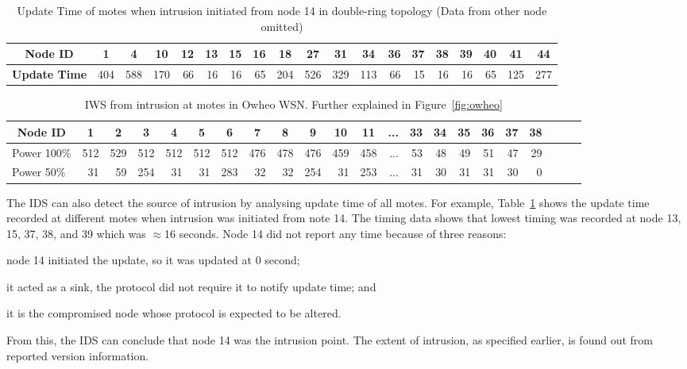 \documentclass[conference]{IEEEtran}
\newcommand*{\bd}[1]{\multicolumn{1}{|c|}{\bfseries #1}}
\begin{document}
\begin{table}[t]
\centering
\begin{tabular}{|l|*{17}{r|}r|}
\hline
\bd{Node ID}           & \bd{1} & \bd{4} & \bd{10} & \bd{12} & \bd{13} & \bd{15} & \bd{16} & \bd{18} & \bd{27} & \bd{31} & \bd{34} & \bd{36} & \bd{37} & \bd{38} & \bd{39} & \bd{40} & \bd{41} & \bd{44}\\
\hline
\bd{Update Time}  &   404 	&  588 	& 170 	& 66 	& 16 &	 16 	& 65 &	 204 &	 526 & 329 &	 113 &	 66 &	 15 	& 16 	& 16 &	 65 &	125 & 277 \\
\hline
\end{tabular}
\caption{Update Time of motes when intrusion initiated from node 14 in double-ring topology (Data from other node omitted) }
\label{tab:dr_time_14}
\end{table}

\begin{table}[t!]
\centering
\begin{tabular}{|l|*{20}{r|}r|}
\hline
\bd{Node ID}           & \bd{1} & \bd{2} & \bd{3} & \bd{4} & \bd{5} & \bd{6} & \bd{7} & \bd{8} & \bd{9} & \bd{10} & \bd{11} & \bd{...} & \bd{33} & \bd{34} & \bd{35} & \bd{36} & \bd{37} & \bd{38} \\
\hline		\hline

Power 100\%	   & 512 & 529 & 512 & 512 & 512  & 512 & 476 & 478 & 476 & 459 & 458 & ...& 53  & 48 & 49 & 51 & 47 & 29 \\
\hline

Power 50\%	  &31 & 59&254& 31& 31 &283& 32& 32& 254& 31 &253 & ... & 31  & 30 & 31 & 31 & 30 & 0 \\
\hline
\end{tabular}
\caption{IWS from intrusion at motes in Owheo WSN. Further explained in Figure~\ref{fig:owheo}}
\label{tab:owheo}
\end{table}


The IDS can also detect the source of intrusion by analysing update time of all motes. %
For example, Table~\ref{tab:dr_time_14} shows the update time recorded at different motes when intrusion was initiated from note 14.
The timing data shows that lowest timing was recorded at node 13, 15, 37, 38, and 39 which was $\approx$16 seconds.
Node 14 did not report any time because of three reasons: 
\begin{inparaenum}
\item node 14 initiated the update, so it was updated at $0$ second;
\item it acted as a sink, the protocol did not require it to notify update time; and 
\item it is the compromised node whose protocol is expected to be altered.
\end{inparaenum}
From this, the IDS can conclude that node 14 was the intrusion point.
The extent of intrusion, as specified earlier, is found out from reported version information.
\end{document}
